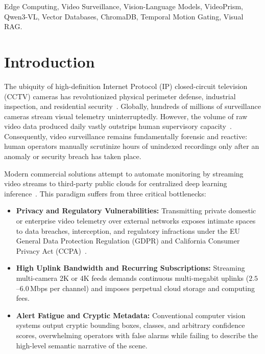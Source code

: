 \documentclass[10pt, conference]{IEEEtran}
\begin{document}
\begin{IEEEkeywords}
Edge Computing, Video Surveillance, Vision-Language Models, VideoPrism, Qwen3-VL, Vector Databases, ChromaDB, Temporal Motion Gating, Visual RAG.
\end{IEEEkeywords}

\section{Introduction}
\label{sec:intro}

The ubiquity of high-definition Internet Protocol (IP) closed-circuit television (CCTV) cameras has revolutionized physical perimeter defense, industrial inspection, and residential security~\cite{valera2005intelligent}. Globally, hundreds of millions of surveillance cameras stream visual telemetry uninterruptedly. However, the volume of raw video data produced daily vastly outstrips human supervisory capacity~\cite{le2021deep}. Consequently, video surveillance remains fundamentally forensic and reactive: human operators manually scrutinize hours of unindexed recordings only after an anomaly or security breach has taken place.

Modern commercial solutions attempt to automate monitoring by streaming video streams to third-party public clouds for centralized deep learning inference~\cite{al2020edge}. This paradigm suffers from three critical bottlenecks:
\begin{itemize}
    \item \textbf{Privacy and Regulatory Vulnerabilities:} Transmitting private domestic or enterprise video telemetry over external networks exposes intimate spaces to data breaches, interception, and regulatory infractions under the EU General Data Protection Regulation (GDPR) and California Consumer Privacy Act (CCPA)~\cite{voigt2017eu}.
    \item \textbf{High Uplink Bandwidth and Recurring Subscriptions:} Streaming multi-camera 2K or 4K feeds demands continuous multi-megabit uplinks ($2.5$--$6.0$\,Mbps per channel) and imposes perpetual cloud storage and computing fees.
    \item \textbf{Alert Fatigue and Cryptic Metadata:} Conventional computer vision systems output cryptic bounding boxes, classes, and arbitrary confidence scores, overwhelming operators with false alarms while failing to describe the high-level semantic narrative of the scene.
\end{itemize}
\end{document}
